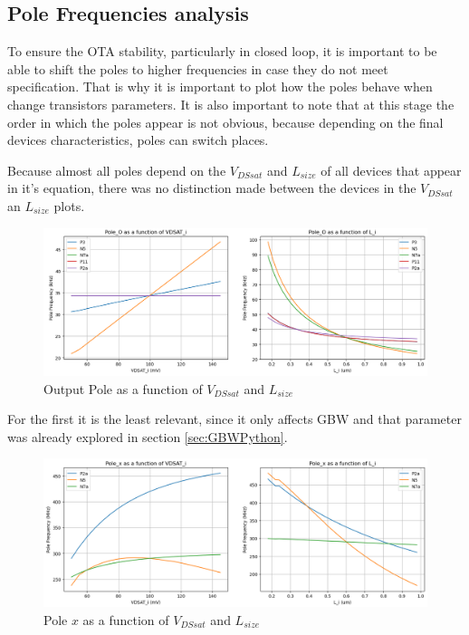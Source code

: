 \subsection{Pole Frequencies analysis}

To ensure the OTA stability, particularly in closed loop, it is important to be able to shift the poles to higher frequencies in case they do not meet specification. That is why it is important to plot how the poles behave when change transistors parameters. It is also important to note that at this stage the order in which the poles appear is not obvious, because depending on the final devices characteristics, poles can switch places.  

Because almost all poles depend on the $V_{DSsat}$ and $L_{size}$ of all devices that appear in it's equation, there was no distinction made between the devices in the $V_{DSsat}$ an $L_{size}$ plots.

\begin{figure}[H]
    \centering
    \includegraphics[width=1\textwidth]{Images/PoPlot.png}
    \caption{Output Pole as a function of $V_{DSsat}$ and $L_{size}$}
    \label{fig:PoPlot}
\end{figure}

For the first it is the least relevant, since it only affects GBW and that parameter was already explored in section \ref{sec:GBWPython}.

\begin{figure}[H]
    \centering
    \includegraphics[width=1\textwidth]{Images/PxPlot.png}
    \caption{Pole $x$ as a function of $V_{DSsat}$ and $L_{size}$}
    \label{fig:PxPlot}
\end{figure}

